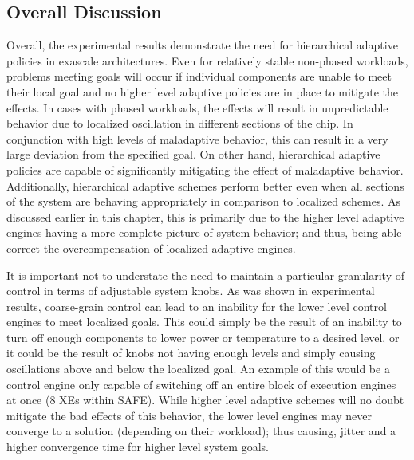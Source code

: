     \subsection{Overall Discussion}
        Overall, the experimental results demonstrate the need for hierarchical adaptive policies in exascale architectures. Even for relatively stable non-phased workloads, problems meeting goals will occur if individual components are unable to meet their local goal and no higher level adaptive policies are in place to mitigate the effects. In cases with phased workloads, the effects will result in unpredictable behavior due to localized oscillation in different sections of the chip. In conjunction with high levels of maladaptive behavior, this can result in a very large deviation from the specified goal. On other hand, hierarchical adaptive policies are capable of significantly mitigating the effect of maladaptive behavior. Additionally, hierarchical adaptive schemes perform better even when all sections of the system are behaving appropriately in comparison to localized schemes. As discussed earlier in this chapter, this is primarily due to the higher level adaptive engines having a more complete picture of system behavior; and thus, being able correct the overcompensation of localized adaptive engines.

        It is important not to understate the need to maintain a particular granularity of control in terms of adjustable system knobs. As was shown in experimental results, coarse-grain control can lead to an inability for the lower level control engines to meet localized goals. This could simply be the result of an inability to turn off enough components to lower power or temperature to a desired level, or it could be the result of knobs not having enough levels and simply causing oscillations above and below the localized goal. An example of this would be a control engine only capable of switching off an entire block of execution engines at once (8 XEs within SAFE). While higher level adaptive schemes will no doubt mitigate the bad effects of this behavior, the lower level engines may never converge to a solution (depending on their workload); thus causing, jitter and a higher convergence time for higher level system goals.
